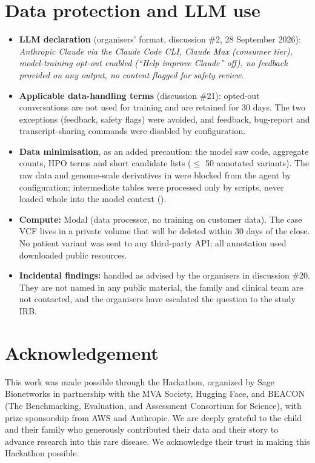 \documentclass[10pt]{article}
\begin{document}
\section{Data protection and LLM use}
\label{sec:data}
\begin{itemize}
\item \textbf{LLM declaration} (organisers' format, discussion \#2, 28 September 2026): \textit{Anthropic Claude via the
  Claude Code CLI, Claude Max (consumer tier), model-training opt-out enabled (``Help improve Claude'' off), no
  feedback provided on any output, no content flagged for safety review.}
\item \textbf{Applicable data-handling terms} (discussion \#21): opted-out conversations are not used for training and
  are retained for 30 days. The two exceptions (feedback, safety flags) were avoided, and feedback, bug-report and
  transcript-sharing commands were disabled by configuration.
\item \textbf{Data minimisation}, as an added precaution: the model saw code, aggregate counts, HPO terms and short
  candidate lists ($\leq$ 50 annotated variants). The raw data and genome-scale derivatives in  were blocked
  from the agent by configuration; intermediate tables were processed only by scripts, never loaded whole into the
  model context ().
\item \textbf{Compute:} Modal (data processor, no training on customer data). The case VCF lives in a private volume
  that will be deleted within 30 days of the close. No patient variant was sent to any third-party API; all
  annotation used downloaded public resources.
\item \textbf{Incidental findings:} handled as advised by the organisers in discussion \#20. They are not named in any
  public material, the family and clinical team are not contacted, and the organisers have escalated the question
  to the study IRB.
\end{itemize}

\section*{Acknowledgement}
This work was made possible through the Hackathon, organized by Sage Bionetworks in partnership with the MVA Society,
Hugging Face, and BEACON (The Benchmarking, Evaluation, and Assessment Consortium for Science), with prize sponsorship
from AWS and Anthropic. We are deeply grateful to the child and their family who generously contributed their data
and their story to advance research into this rare disease. We acknowledge their trust in making this Hackathon
possible.
\end{document}
